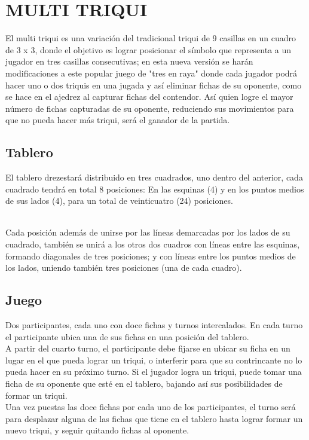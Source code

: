\documentclass{article}
\begin{document}
\section{MULTI TRIQUI} \label{Contenido}

El multi triqui es una variación del tradicional triqui de 9 casillas en un cuadro de 3 x 3, donde el objetivo es lograr posicionar el símbolo que representa a un jugador en tres casillas consecutivas; en esta nueva versión se harán modificaciones a este popular juego de "tres en raya" donde cada jugador podrá hacer uno o dos triquis en una jugada y así eliminar fichas de su oponente, como se hace en el ajedrez al capturar fichas del contendor. Así quien logre el mayor número de fichas capturadas de su oponente, reduciendo sus movimientos para que no pueda hacer más triqui, será el ganador de la partida.

\subsection {Tablero}

El tablero drezestará distribuido en tres cuadrados, uno dentro del anterior, cada cuadrado tendrá en total 8 posiciones: En las esquinas (4) y en los puntos medios de sus lados (4), para un total de veinticuatro (24) posiciones. \\\

Cada posición además de unirse por las líneas demarcadas por los lados de su cuadrado, también se unirá a los otros dos cuadros con líneas entre las esquinas, formando diagonales de tres posiciones; y con líneas entre los puntos medios de los lados, uniendo también tres posiciones (una de cada cuadro).

\subsection {Juego}

Dos participantes, cada uno con doce fichas y turnos intercalados.
En cada turno el participante ubica una de sus fichas en una posición del tablero.\\
A partir del cuarto turno, el participante debe fijarse en ubicar su ficha en un lugar en el que pueda lograr un triqui, o interferir para que su contrincante no lo pueda hacer en su próximo turno.
Si el jugador logra un triqui, puede tomar una ficha de su oponente que esté en el tablero, bajando así sus posibilidades de formar un triqui.\\
Una vez puestas las doce fichas por cada uno de los participantes, el turno será para desplazar alguna de las fichas que tiene en el tablero hasta lograr formar un nuevo triqui, y seguir quitando fichas al oponente.
\end{document}
